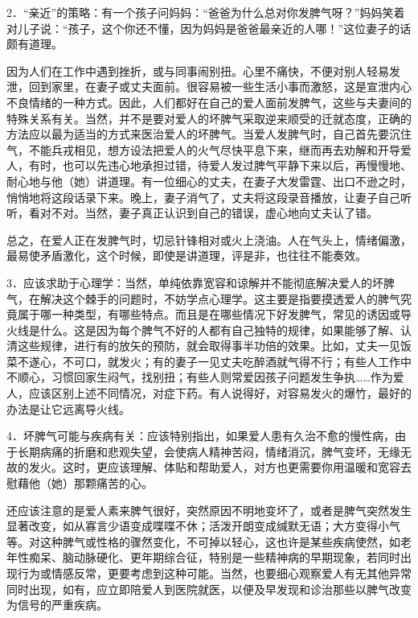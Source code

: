 \documentclass[12pt,UTF8]{ctexbook}
\begin{document}
2．“亲近”的策略：有一个孩子问妈妈：“爸爸为什么总对你发脾气呀？”妈妈笑着对儿子说：“孩子，这个你还不懂，因为妈妈是爸爸最亲近的人哪！”这位妻子的话颇有道理。

因为人们在工作中遇到挫折，或与同事闹别扭。心里不痛快，不便对别人轻易发泄，回到家里，在妻子或丈夫面前。很容易被一些生活小事而激怒，这是宣泄内心不良情绪的一种方式。因此，人们都好在自己的爱人面前发脾气，这些与夫妻间的特殊关系有关。当然，并不是要对爱人的坏脾气采取逆来顺受的迁就态度，正确的方法应以最为适当的方式来医治爱人的坏脾气。当爱人发脾气时，自己首先要沉住气，不能兵戎相见，想方设法把爱人的火气尽快平息下来，继而再去劝解和开导爱人，有时，也可以先违心地承担过错，待爱人发过脾气平静下来以后，再慢慢地、耐心地与他（她）讲道理。有一位细心的丈夫，在妻子大发雷霆、出口不逊之时，悄悄地将这段话录下来。晚上，妻子消气了，丈夫将这段录音播放，让妻子自己听听，看对不对。当然，妻子真正认识到自己的错误，虚心地向丈夫认了错。

总之，在爱人正在发脾气时，切忌针锋相对或火上浇油。人在气头上，情绪偏激，最易使矛盾激化，这个时候，即使是讲道理，评是非，也往往不能奏效。

3．应该求助于心理学：当然，单纯依靠宽容和谅解并不能彻底解决爱人的坏脾气，在解决这个棘手的问题时，不妨学点心理学。这主要是指要摸透爱人的脾气究竟属于哪一种类型，有哪些特点。而且是在哪些情况下好发脾气，常见的诱因或导火线是什么。这是因为每个脾气不好的人都有自己独特的规律，如果能够了解、认清这些规律，进行有的放矢的预防，就会取得事半功倍的效果。比如，丈夫一见饭菜不遂心，不可口，就发火；有的妻子一见丈夫吃醉酒就气得不行；有些人工作中不顺心，习惯回家生闷气，找别扭；有些人则常爱因孩子问题发生争执……作为爱人，应该区别上述不同情况，对症下药。有人说得好，对容易发火的爆竹，最好的办法是让它远离导火线。

4．坏脾气可能与疾病有关：应该特别指出，如果爱人患有久治不愈的慢性病，由于长期病痛的折磨和悲观失望，会使病人精神苦闷，情绪消沉，脾气变坏，无缘无故的发火。这时，更应该理解、体贴和帮助爱人，对方也更需要你用温暖和宽容去慰藉他（她）那颗痛苦的心。

还应该注意的是爱人素来脾气很好，突然原因不明地变坏了，或者是脾气突然发生显著改变，如从寡言少语变成喋喋不休；活泼开朗变成缄默无语；大方变得小气等。对这种脾气或性格的骤然变化，不可掉以轻心，这也许是某些疾病使然，如老年性痴呆、脑动脉硬化、更年期综合征，特别是一些精神病的早期现象，若同时出现行为或情感反常，更要考虑到这种可能。当然，也要细心观察爱人有无其他异常同时出现，如有，应立即陪爱人到医院就医，以便及早发现和诊治那些以脾气改变为信号的严重疾病。
\end{document}
